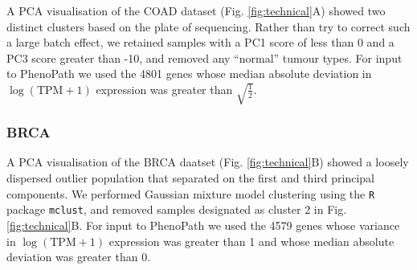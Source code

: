 A PCA visualisation of the COAD dataset (Fig. \ref{fig:technical}A) showed two distinct clusters based on the plate of sequencing. Rather than try to correct such a large batch effect, we retained samples with a PC1 score of less than 0 and a PC3 score greater than -10, and removed any ``normal'' tumour types. For input to PhenoPath we used the 4801 genes whose median absolute deviation in $\log(\text{TPM} + 1)$ expression was greater than $\sqrt{\frac{1}{2}}$.

\subsubsection{BRCA}

A PCA visualisation of the BRCA daatset (Fig. \ref{fig:technical}B) showed a loosely dispersed outlier population that separated on the first and third principal components. We performed Gaussian mixture model clustering using the \texttt{R} package \texttt{mclust}\cite{Fraley_undated-ug}, and removed samples designated as cluster 2 in Fig. \ref{fig:technical}B. For input to PhenoPath we used the 4579 genes whose variance in $\log(\text{TPM} + 1)$ expression was greater than 1 and whose median absolute deviation was greater than 0.
